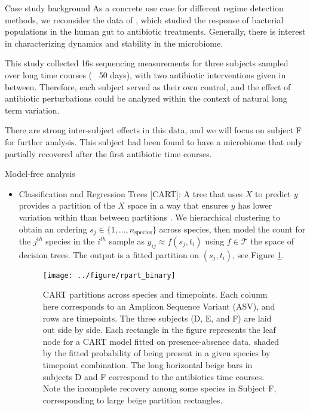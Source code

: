 \documentclass[final, 8pt]{beamer}
\newlength{\onecolwid}
\begin{document}
\begin{frame}
\begin{columns}
\begin{column}{\onecolwid}
\begin{block}{Case study background}
As a concrete use case for different regime detection methods, we reconsider the
data of \citep{dethlefsen2011incomplete}, which studied the response of
bacterial populations in the human gut to antibiotic treatments. Generally,
there is interest in characterizing dynamics and stability in the microbiome.

This study collected 16s sequencing measurements for three subjects sampled over
long time courses (~ 50 days), with two antibiotic interventions given in
between. Therefore, each subject served as their own control, and the effect of
antibiotic perturbations could be analyzed within the context of natural long
term variation.

There are strong inter-subject effects in this data, and we will focus on
subject F for further analysis. This subject had been found to have a microbiome
that only partially recovered after the first antibiotic time courses.
\end{block}

\begin{block}{Model-free analysis}
\begin{itemize}
\item Classification and Regression Trees [CART]: A tree that uses $X$ to
  predict $y$ provides a partition of the $X$ space in a way that ensures $y$
  has lower variation within than between partitions
  \citep{breiman1984classification}. We hierarchical clustering to obtain an
  ordering $s_{j} \in \{1, \dots, n_{\text{species}}\}$ across species, then
  model the count for the $j^{th}$ species in the $i^{th}$ sample as $y_{ij}
  \approx f\left(s_{j}, t_{i}\right)$ using $f \in \mathcal{T}$ the space of
  decision trees. The output is a fitted partition on $\left(s_{j},
  t_{i}\right)$, see Figure \ref{fig:rpart_binary}.

\begin{figure}[ht]
  \centering
  \texttt{[image: ../figure/rpart\_binary]}
  \caption{CART partitions across species and timepoints. Each column here
    corresponds to an Amplicon Sequence Variant (ASV), and rows are timepoints.
    The three subjects (D, E, and F) are laid out side by side. Each rectangle
    in the figure represents the leaf node for a CART model fitted on
    presence-absence data, shaded by the fitted probability of being present in
    a given species by timepoint combination. The long horizontal beige bars in
    subjects D and F correspond to the antibiotics time courses. Note the
    incomplete recovery among some species in Subject F, corresponding to large
    beige partition rectangles.
    \label{fig:rpart_binary}}
\end{figure}
\end{itemize}
\end{block}
\end{column}


\end{columns}
\end{frame}
\end{document}
